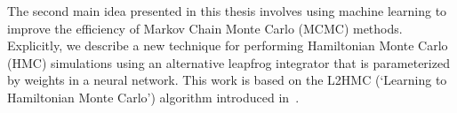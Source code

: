 \begin{doublespace}
%
%
The second main idea presented in this thesis involves using machine learning to improve the efficiency of Markov Chain
Monte Carlo (MCMC) methods.
%
Explicitly, we describe a new technique for performing Hamiltonian Monte Carlo (HMC) simulations using an alternative
leapfrog integrator that is parameterized by weights in a neural network.
%
This work is based on the L2HMC (`Learning to Hamiltonian Monte Carlo') algorithm introduced
in~\cite{2017arXiv171109268L}.
%
%
%
%
%





\end{doublespace}
